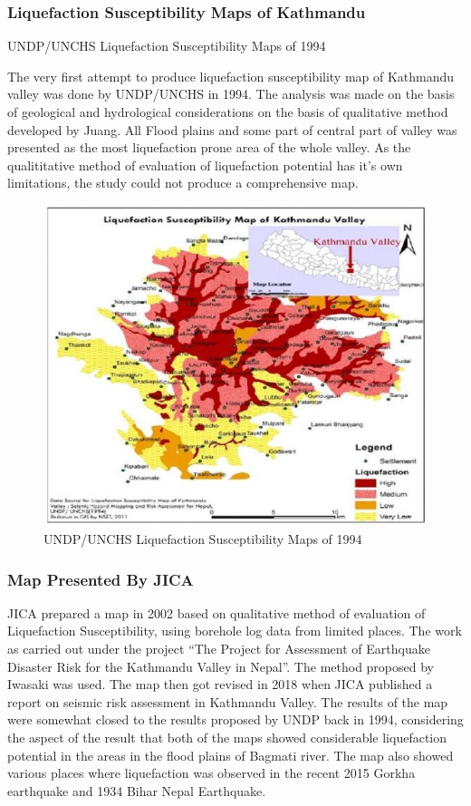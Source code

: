 \subsubsection{Liquefaction Susceptibility Maps of Kathmandu}
UNDP/UNCHS Liquefaction Susceptibility Maps of 1994

The very first attempt to produce liquefaction susceptibility map of Kathmandu valley was done by UNDP/UNCHS in 1994. The analysis was made on the basis of geological and hydrological considerations on the basis of qualitative method developed by Juang\cite{r25}. All Flood plains and some part of central part of valley was presented as the most liquefaction prone area of the whole valley.  As the qualititative method of evaluation of liquefaction potential has it’s own limitations, the study could not produce a comprehensive  map.

\begin{figure}[!hbt]
\centering
\includegraphics[width=0.75\linewidth,keepaspectratio]{images/main/undp_susceptibility.jpg}
\caption{UNDP/UNCHS Liquefaction Susceptibility Maps of 1994}
\end{figure}

\subsubsection{Map Presented By JICA}

JICA prepared a map in 2002 based on qualitative method of evaluation of Liquefaction Susceptibility, using borehole log data from limited places. The work as carried out under the project “The Project for Assessment of Earthquake Disaster Risk for the Kathmandu Valley in Nepal”. The method proposed by Iwasaki \cite{r26} was used. The map then got revised in 2018 when JICA published a report on seismic risk assessment in Kathmandu Valley. The results of the map were somewhat closed to the results proposed by UNDP back in 1994, considering the aspect of the result that both of the maps showed considerable liquefaction potential in the areas in the flood plains of Bagmati river. The map also showed various places where liquefaction was observed in the recent 2015 Gorkha earthquake and 1934 Bihar Nepal Earthquake.

